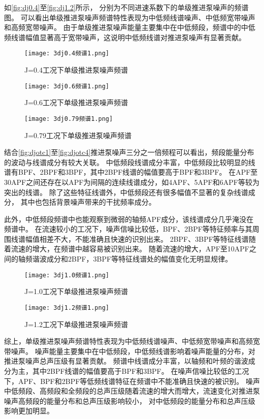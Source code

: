 如\autoref{fig:dj0.4}至\autoref{fig:dj1.2}所示，
分别为不同进速系数下的单级推进泵噪声的频谱图。
可以看出单级推进泵噪声频谱特性表现为中低频线谱噪声、中低频宽带噪声和高频宽带噪声。
由于单级推进泵噪声能量主要集中在中低频段，频谱中的中低频线谱幅值显著高于宽带噪声，这说明中低频线谱对推进泵噪声有显著贡献。
\begin{figure}[htbp]
    \centering
    \texttt{[image: 3dj0.4频谱1.png]}
    \caption{\label{fig:dj0.4}J=0.4工况下单级推进泵噪声频谱}
\end{figure}
\begin{figure}[htbp]
    \centering
    \texttt{[image: 3dj0.6频谱1.png]}
    \caption{\label{fig:dj0.6}J=0.6工况下单级推进泵噪声频谱}
\end{figure}
\begin{figure}[htbp]
    \centering
    \texttt{[image: 3dj0.79频谱1.png]}
    \caption{\label{fig:dj0.79}J=0.79工况下单级推进泵噪声频谱}
\end{figure}
结合\autoref{fig:djotc1}至\autoref{fig:djotc4}推进泵噪声三分之一倍频程可以看出，频段能量分布的波动与线谱成分有较大关联。
中低频段线谱成分丰富，中低频段比较明显的线谱有BPF、2BPF和3BPF，其中2BPF线谱的幅值要高于BPF和3BPF。
在APF至30APF之间还存在以APF为间隔的连续线谱成分，如4APF、5APF和6APF等较为突出的线谱。
除了这些特征线谱外，中低频段还有很多幅值不显著的复杂线谱成分，
其中也包括背景噪声带来的干扰频率成分。

此外，中低频段频谱中也能观察到微弱的轴频APF成分，该线谱成分几乎淹没在频谱中。
在流速较小的工况下，噪声信噪比较低，BPF、2BPF等特征频率与其周围线谱幅值相差不大，不能准确且快速的识别出来。
2BPF、3BPF等特征线谱随着流速的增大，在频谱中越容易被识别出来。
随着流速的增大，APF至10APF之间的轴频谐波成分和2BPF，3BPF等特征线谱处的幅值变化无明显规律。
\begin{figure}[htbp]
    \centering
    \texttt{[image: 3dj1.0频谱1.png]}
    \caption{\label{fig:dj1}J=1.0工况下单级推进泵噪声频谱}
\end{figure}
\begin{figure}[htbp]
    \centering
    \texttt{[image: 3dj1.2频谱1.png]}
    \caption{\label{fig:dj1.2}J=1.2工况下单级推进泵噪声频谱}
\end{figure}

综上，单级推进泵噪声频谱特性表现为中低频线谱噪声、中低频宽带噪声和高频宽带噪声。
噪声能量主要集中在中低频段，中低频线谱影响着噪声能量的分布，对推进泵噪声总声压级有显著贡献。
频谱中线谱成分丰富，以轴频和叶频的谐波成分为主，其中2BPF线谱的幅值要高于BPF和3BPF。
在噪声信噪比较低的工况下，APF、BPF和2BPF等低频线谱特征在频谱中不能准确且快速的被识别。
噪声中低频段、高频段和全频段的总声压级随着流速的增大而增大，流速变化对推进泵噪声高频段的能量分布和总声压级影响较小，
对中低频段的能量分布和总声压级影响更加明显。

